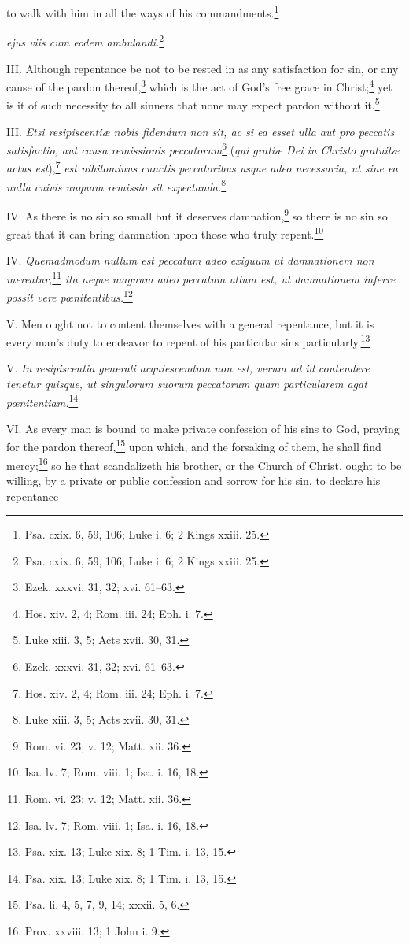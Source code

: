 to walk with him in all the ways of his commandments.\footnote{Psa. cxix. 6, 59, 106; Luke i. 6; 2 Kings xxiii. 25.}

\emph{ejus viis cum eodem ambulandi.}\footnote{Psa. cxix. 6, 59, 106; Luke i. 6; 2 Kings xxiii. 25.}

III. Although repentance be not to be rested in as any satisfaction for sin, or any cause of the pardon thereof,\footnote{Ezek. xxxvi. 31, 32; xvi. 61–63.} which is the act of God's free grace in Christ;\footnote{Hos. xiv. 2, 4; Rom. iii. 24; Eph. i. 7.} yet is it of such necessity to all sinners that none may expect pardon without it.\footnote{Luke xiii. 3, 5; Acts xvii. 30, 31.}

III. \emph{Etsi resipiscentiæ nobis fidendum non sit, ac si ea esset ulla aut pro peccatis satisfactio, aut causa remissionis peccatorum}\footnote{Ezek. xxxvi. 31, 32; xvi. 61–63.} (\emph{qui gratiæ Dei in Christo gratuitæ actus est}),\footnote{Hos. xiv. 2, 4; Rom. iii. 24; Eph. i. 7.}\emph{ est nihilominus cunctis peccatoribus usque adeo necessaria, ut sine ea nulla cuivis unquam remissio sit expectanda.}\footnote{Luke xiii. 3, 5; Acts xvii. 30, 31.}

IV. As there is no sin so small but it deserves damnation,\footnote{Rom. vi. 23; v. 12; Matt. xii. 36.} so there is no sin so great that it can bring damnation upon those who truly repent.\footnote{Isa. lv. 7; Rom. viii. 1; Isa. i. 16, 18.}

IV. \emph{Quemadmodum nullum est peccatum adeo exiguum ut damnationem non mereatur,}\footnote{Rom. vi. 23; v. 12; Matt. xii. 36.}\emph{ ita neque magnum adeo peccatum ullum est, ut damnationem inferre possit vere pœnitentibus.}\footnote{Isa. lv. 7; Rom. viii. 1; Isa. i. 16, 18.}

V. Men ought not to content themselves with a general repentance, but it is every man's duty to endeavor to repent of his particular sins particularly.\footnote{Psa. xix. 13; Luke xix. 8; 1 Tim. i. 13, 15.}

V. \emph{In resipiscentia generali acquiescendum non est, verum ad id contendere tenetur quisque, ut singulorum suorum peccatorum quam particularem agat pœnitentiam.}\footnote{Psa. xix. 13; Luke xix. 8; 1 Tim. i. 13, 15.}

VI. As every man is bound to make private confession of his sins to God, praying for the pardon thereof,\footnote{Psa. li. 4, 5, 7, 9, 14; xxxii. 5, 6.} upon which, and the forsaking of them, he shall find mercy;\footnote{Prov. xxviii. 13; 1 John i. 9.} so he that scandalizeth his brother, or the Church of Christ, ought to be willing, by a private or public confession and sorrow for his sin, to declare his repentance

